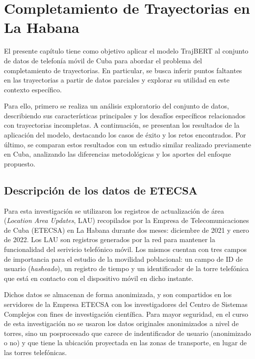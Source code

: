 \chapter{Completamiento de Trayectorias en La Habana}\label{chapter:implementation}

El presente capítulo tiene como objetivo aplicar el modelo TrajBERT al conjunto de datos de telefonía móvil de Cuba para abordar el problema del completamiento de trayectorias. En particular, se busca inferir puntos faltantes en las trayectorias a partir de datos parciales y explorar su utilidad en este contexto específico.

Para ello, primero se realiza un análisis exploratorio del conjunto de datos, describiendo sus características principales y los desafíos específicos relacionados con trayectorias incompletas. A continuación, se presentan los resultados de la aplicación del modelo, destacando los casos de éxito y los retos encontrados. Por último, se comparan estos resultados con un estudio similar realizado previamente en Cuba, analizando las diferencias metodológicas y los aportes del enfoque propuesto.

\section{Descripción de los datos de ETECSA}

Para esta investigación se utilizaron los registros de actualización de área (\textit{Location Area Updates}, LAU) recopilados por la Empresa de Telecomunicaciones de Cuba (ETECSA) en La Habana durante dos meses: diciembre de 2021 y enero de 2022. Los LAU son registros generados por la red para mantener la funcionalidad del serivicio telef\'onico m\'ovil. Los mismos cuentan con tres campos de importancia para el estudio de la movilidad poblacional: un campo de ID de usuario ({\it hasheado}), un registro de tiempo y un identificador de la torre telef\'onica que est\'a en contacto con el dispositivo m\'ovil en dicho instante.

Dichos datos se almacenan de forma anonimizada, y son compartidos en los servidores de la Empresa ETECSA con los investigadores del Centro de Sistemas Complejos con fines de investigaci\'on cient\'ifica. Para mayor seguridad, en el curso de esta investigaci\'on no se usaron los datos originales anonimizados a nivel de torres, sino un posprocesado que carece de indentificador de usuario (anonimizado o no) y que tiene la ubicaci\'on proyectada en las zonas de transporte, en lugar de las torres telef\'onicas.

